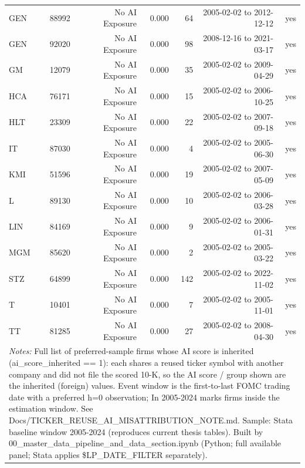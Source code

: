 \begin{tabular}{lrrrrrr}
GEN & 88992 & No AI Exposure & 0.000 & 64 & 2005-02-02 to 2012-12-12 & yes \\
GEN & 92020 & No AI Exposure & 0.000 & 98 & 2008-12-16 to 2021-03-17 & yes \\
GM & 12079 & No AI Exposure & 0.000 & 35 & 2005-02-02 to 2009-04-29 & yes \\
HCA & 76171 & No AI Exposure & 0.000 & 15 & 2005-02-02 to 2006-10-25 & yes \\
HLT & 23309 & No AI Exposure & 0.000 & 22 & 2005-02-02 to 2007-09-18 & yes \\
IT & 87030 & No AI Exposure & 0.000 & 4 & 2005-02-02 to 2005-06-30 & yes \\
KMI & 51596 & No AI Exposure & 0.000 & 19 & 2005-02-02 to 2007-05-09 & yes \\
L & 89130 & No AI Exposure & 0.000 & 10 & 2005-02-02 to 2006-03-28 & yes \\
LIN & 84169 & No AI Exposure & 0.000 & 9 & 2005-02-02 to 2006-01-31 & yes \\
MGM & 85620 & No AI Exposure & 0.000 & 2 & 2005-02-02 to 2005-03-22 & yes \\
STZ & 64899 & No AI Exposure & 0.000 & 142 & 2005-02-02 to 2022-11-02 & yes \\
T & 10401 & No AI Exposure & 0.000 & 7 & 2005-02-02 to 2005-11-01 & yes \\
TT & 81285 & No AI Exposure & 0.000 & 27 & 2005-02-02 to 2008-04-30 & yes \\
\bottomrule
\multicolumn{7}{p{0.95\linewidth}}{\footnotesize \textit{Notes:} Full list of preferred-sample firms whose AI score is inherited (ai\_score\_inherited == 1): each shares a reused ticker symbol with another company and did not file the scored 10-K, so the AI score / group shown are the inherited (foreign) values. Event window is the first-to-last FOMC trading date with a preferred h=0 observation; In 2005-2024 marks firms inside the estimation window. See Docs/TICKER\_REUSE\_AI\_MISATTRIBUTION\_NOTE.md. Sample: Stata baseline window 2005-2024 (reproduces current thesis tables). Built by 00\_master\_data\_pipeline\_and\_data\_section.ipynb (Python; full available panel; Stata applies \$LP\_DATE\_FILTER separately).} \\
\end{tabular}
